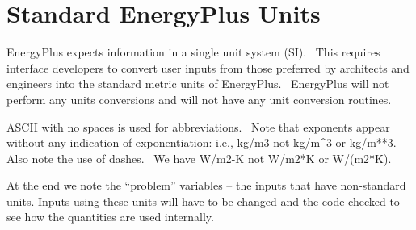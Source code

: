 \section{Standard EnergyPlus Units}\label{standard-energyplus-units}

EnergyPlus expects information in a single unit system (SI).~ This requires interface developers to convert user inputs from those preferred by architects and engineers into the standard metric units of EnergyPlus.~ EnergyPlus will not perform any units conversions and will not have any unit conversion routines.

ASCII with no spaces is used for abbreviations.~ Note that exponents appear without any indication of exponentiation: i.e., kg/m3 not kg/m\^{}3 or kg/m**3.~ Also note the use of dashes.~ We have W/m2-K not W/m2*K or W/(m2*K).

At the end we note the ``problem'' variables -- the inputs that have non-standard units. Inputs using these units will have to be changed and the code checked to see how the quantities are used internally.

